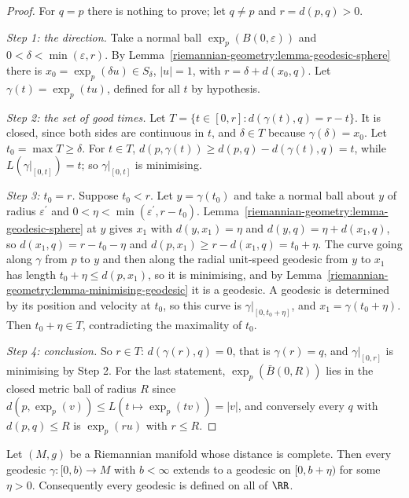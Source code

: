 \begin{proof}
For $q = p$ there is nothing to prove; let $q \neq p$ and $r = d(p, q) > 0$.

\emph{Step 1: the direction.} Take a normal ball $\exp_p(B(0, \varepsilon))$ and $0 < \delta < \min(\varepsilon, r)$. By Lemma~\ref{riemannian-geometry:lemma-geodesic-sphere} there is $x_0 = \exp_p(\delta u) \in S_\delta$, $|u| = 1$, with
$r = \delta + d(x_0, q)$. Let $\gamma(t) = \exp_p(tu)$, defined for all $t$ by hypothesis.

\emph{Step 2: the set of good times.} Let $T = \{t \in [0, r] : d(\gamma(t), q) = r - t\}$. It is closed, since both sides are continuous in $t$, and $\delta \in T$ because $\gamma(\delta) = x_0$. Let $t_0 = \max T \geq \delta$. For
$t \in T$, $d(p, \gamma(t)) \geq d(p, q) - d(\gamma(t), q) = t$, while $L(\gamma|_{[0, t]}) = t$; so $\gamma|_{[0, t]}$ is minimising.

\emph{Step 3: $t_0 = r$.} Suppose $t_0 < r$. Let $y = \gamma(t_0)$ and take a normal ball about $y$ of radius $\varepsilon^{\prime}$ and $0 < \eta < \min(\varepsilon^{\prime}, r - t_0)$. Lemma~\ref{riemannian-geometry:lemma-geodesic-sphere} at $y$ gives
$x_1$ with $d(y, x_1) = \eta$ and $d(y, q) = \eta + d(x_1, q)$, so $d(x_1, q) = r - t_0 - \eta$ and $d(p, x_1) \geq r - d(x_1, q) = t_0 + \eta$. The curve going along $\gamma$ from $p$ to $y$ and then along the radial unit-speed
geodesic from $y$ to $x_1$ has length $t_0 + \eta \leq d(p, x_1)$, so it is minimising, and by Lemma~\ref{riemannian-geometry:lemma-minimising-geodesic} it is a geodesic. A geodesic is determined by its position and velocity at
$t_0$, so this curve is $\gamma|_{[0, t_0 + \eta]}$, and $x_1 = \gamma(t_0 + \eta)$. Then $t_0 + \eta \in T$, contradicting the maximality of $t_0$.

\emph{Step 4: conclusion.} So $r \in T$: $d(\gamma(r), q) = 0$, that is $\gamma(r) = q$, and $\gamma|_{[0, r]}$ is minimising by Step 2. For the last statement, $\exp_p(\bar B(0, R))$ lies in the closed metric ball of radius $R$
since $d(p, \exp_p(v)) \leq L(t \mapsto \exp_p(tv)) = |v|$, and conversely every $q$ with $d(p, q) \leq R$ is $\exp_p(ru)$ with $r \leq R$.
\end{proof}

\begin{lemma}\label{riemannian-geometry:lemma-extension-geodesics}
Let $(M, g)$ be a Riemannian manifold whose distance is complete. Then every geodesic $\gamma \colon [0, b) \to M$ with $b < \infty$ extends to a geodesic on $[0, b + \eta)$ for some $\eta > 0$. Consequently every geodesic
is defined on all of $\RR$.
\end{lemma}


